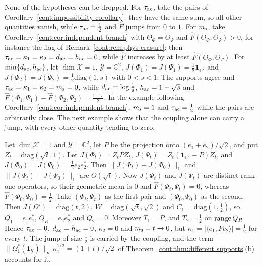 None of the hypotheses can be dropped. For $\tau_{\rm ac}$, take the pairs of Corollary~\ref{cont:impossibility corollary}: they have the same sum, so all other quantities vanish, while $\tau_{\rm ac}=\frac12$ and $\widehat F$ jumps from $0$ to $1$. For $m_{\rm s}$, take Corollary~\ref{cont:cor:independent branch} with $\Theta_\Phi=\Theta_\Psi$ and $\widehat F(\Theta_\Phi,\Theta_\Psi)>0$, for instance the flag of Remark~\ref{cont:rem:phys-erasure}: then $\tau_{\rm ac}=\kappa_1=\kappa_2=d_{\rm ac}=h_{\rm ac}=0$, while $\widehat F$ increases by at least $\widehat F(\Theta_\Phi,\Theta_\Psi)$. For $\min\{d_{\rm ac},h_{\rm ac}\}$, let $\dim\mathcal{X}=1$, $\mathcal{Y}=\mathbb{C}^2$, $J(\Phi_1)=J(\Psi_1)=\frac12\mathbf{1}_{\mathbb{C}^2}$ and $J(\Phi_2)=J(\Psi_2)=\frac12\mathrm{diag}(1,s)$ with $0<s<1$. The supports agree and $\tau_{\rm ac}=\kappa_1=\kappa_2=m_{\rm s}=0$, while $d_{\rm ac}=\log\frac1s$, $h_{\rm ac}=1-\sqrt s$ and $\widehat F(\Phi_1,\Psi_1)-\widehat F(\Phi_2,\Psi_2)=\frac{1-s}2$. In the example following Corollary~\ref{cont:cor:independent branch}, $m_{\rm s}=1$ and $\tau_{\rm ac}=\frac12$ while the pairs are arbitrarily close. The next example shows that the coupling alone can carry a jump, with every other quantity tending to zero.

\begin{example}[Coupling]\label{cont:ex:coupling}
Let $\dim\mathcal{X}=1$ and $\mathcal{Y}=\mathbb{C}^2$, let $P$ be the projection onto $(e_1+e_2)/\sqrt2$, and put $Z_t=\mathrm{diag}(\sqrt t,1)$. Let $J(\Phi_t)=Z_tPZ_t$, $J(\Psi_t)=Z_t(\mathbf{1}_{\mathbb{C}^2}-P)Z_t$, and $J(\Phi_0)=J(\Psi_0)=\frac12e_2e_2^*$. Then $\|J(\Phi_t)-J(\Phi_0)\|_1$ and $\|J(\Psi_t)-J(\Psi_0)\|_1$ are $O(\sqrt t)$. Now $J(\Phi_t)$ and $J(\Psi_t)$ are distinct rank-one operators, so their geometric mean is $0$ and $\widehat F(\Phi_t,\Psi_t)=0$, whereas $\widehat F(\Phi_0,\Psi_0)=\frac12$. Take $(\Phi_t,\Psi_t)$ as the first pair and $(\Phi_0,\Psi_0)$ as the second. Then $J(\Omega')=\mathrm{diag}(t,2)$, $W=\mathrm{diag}(\sqrt t,\sqrt2)$ and $C_1=\mathrm{diag}(1,\frac12)$, so $Q_1=e_1e_1^*$, $Q_R=e_2e_2^*$ and $Q_2=0$. Moreover $T_1=P$, and $T_2=\frac12$ on $\operatorname{range} Q_R$. Hence $\tau_{\rm ac}=0$, $d_{\rm ac}=h_{\rm ac}=0$, $\kappa_2=0$ and $m_{\rm s}=t\to0$, but $\kappa_1=|\langle e_1,Pe_2\rangle|=\frac12$ for every $t$. The jump of size $\frac12$ is carried by the coupling, and the term $\|\Omega_1^*(\mathbf{1}_{\mathcal{Y}})\|_\infty\kappa_1^{1/2}=(1+t)/\sqrt2$ of Theorem~\ref{cont:thm:different supports}(b) accounts for it.
\end{example}

